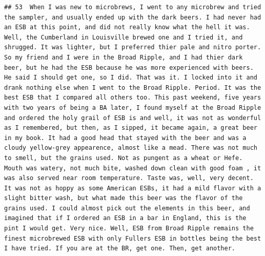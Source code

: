 \documentclass[
  a4paper,
]{article}
\begin{document}
\begin{verbatim}
## 53  When I was new to microbrews, I went to any microbrew and tried the sampler, and usually ended up with the dark beers. I had never had an ESB at this point, and did not really know what the hell it was. Well, the Cumberland in Louisville brewed one and I tried it, and shrugged. It was lighter, but I preferred thier pale and nitro porter. So my friend and I were in the Broad Ripple, and I had thier dark beer, but he had the ESB because he was more experienced with beers. He said I should get one, so I did. That was it. I locked into it and drank nothing else when I went to the Broad Ripple. Period. It was the best ESB that I compared all others too. This past weekend, five years with two years of being a BA later, I found myself at the Broad Ripple and ordered the holy grail of ESB is and well, it was not as wonderful as I remembered, but then, as I sipped, it became again, a great beer in my book. It had a good head that stayed with the beer and was a cloudy yellow-grey appearence, almost like a mead. There was not much to smell, but the grains used. Not as pungent as a wheat or Hefe. Mouth was watery, not much bite, washed down clean with good foam , it was also served near room temperature. Taste was, well, very decent. It was not as hoppy as some American ESBs, it had a mild flavor with a slight bitter wash, but what made this beer was the flavor of the grains used. I could almost pick out the elements in this beer, and imagined that if I ordered an ESB in a bar in England, this is the pint I would get. Very nice. Well, ESB from Broad Ripple remains the finest microbrewed ESB with only Fullers ESB in bottles being the best I have tried. If you are at the BR, get one. Then, get another.

\end{verbatim}
\end{document}
